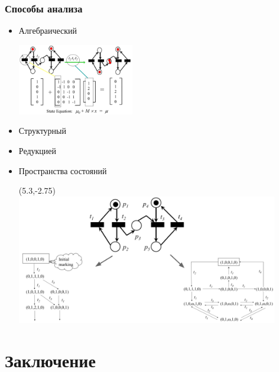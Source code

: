 \documentclass{../../slides-style}
\begin{document}
    \begin{frame}
        \frametitle{Способы анализа}
        \begin{itemize}
            \item Алгебраический

            \includegraphics[width=0.4\textwidth]{petriAlgebraicAnalysis.png}
            \item Структурный
            \item Редукцией
            \item Пространства состояний
            \begin{textblock}{6}(5.3,-2.75)
                \includegraphics[width=0.9\textwidth]{petriStateSpaceAnalysis.png}
            \end{textblock}
        \end{itemize}
    \end{frame}

    \section{Заключение}
\end{document}
